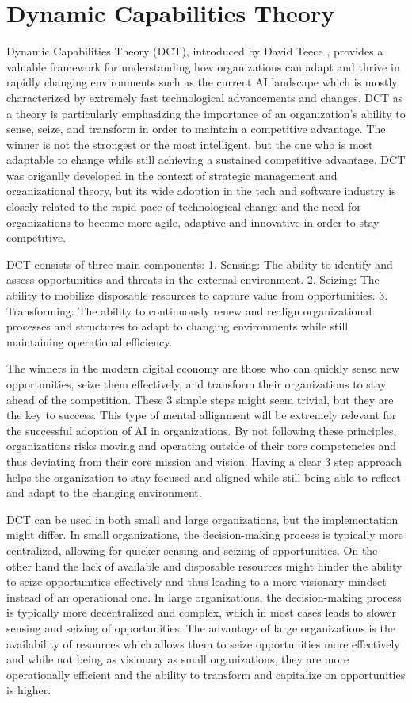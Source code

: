 \documentclass[]{imc-inf}
\begin{document}
\section{Dynamic Capabilities Theory}

Dynamic Capabilities Theory (DCT), introduced by David Teece \citep{Teece1997}, provides a
valuable framework for understanding how organizations can adapt and
thrive in rapidly changing environments such as the current AI landscape
which is mostly characterized by extremely fast technological
advancements and changes. DCT as a theory is particularly emphasizing
the importance of an organization's ability to sense, seize, and
transform in order to maintain a competitive advantage. The winner is
not the strongest or the most intelligent, but the one who is most
adaptable to change while still achieving a sustained competitive
advantage. DCT was origanlly developed in the context of strategic
management and organizational theory, but its wide adoption in the tech
and software industry is closely related to the rapid pace of
technological change and the need for organizations to become more
agile, adaptive and innovative in order to stay competitive.

DCT consists of three main components: 1. Sensing: The ability to
identify and assess opportunities and threats in the external
environment. 2. Seizing: The ability to mobilize disposable resources to
capture value from opportunities. 3. Transforming: The ability to
continuously renew and realign organizational processes and structures \citep{Liu2024}
to adapt to changing environments while still maintaining operational
efficiency.

The winners in the modern digital economy are those who can quickly
sense new opportunities, seize them effectively, and transform their
organizations to stay ahead of the competition. These 3 simple steps
might seem trivial, but they are the key to success. This type of mental
allignment will be extremely relevant for the successful adoption of AI
in organizations. By not following these principles, organizations risks
moving and operating outside of their core competencies and thus
deviating from their core mission and vision. Having a clear 3 step
approach helps the organization to stay focused and aligned while still
being able to reflect and adapt to the changing environment.

DCT can be used in both small and large organizations, but the
implementation might differ. In small organizations, the decision-making
process is typically more centralized, allowing for quicker sensing and
seizing of opportunities. On the other hand the lack of available and
disposable resources might hinder the ability to seize opportunities
effectively and thus leading to a more visionary mindset instead of an
operational one. In large organizations, the decision-making process is
typically more decentralized and complex, which in most cases leads to
slower sensing and seizing of opportunities. The advantage of large
organizations is the availability of resources which allows them to
seize opportunities more effectively and while not being as visionary as
small organizations, they are more operationally efficient and the
ability to transform and capitalize on opportunities is higher.
\end{document}
